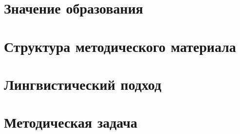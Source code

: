 

\section{Значение образования}



\section{Структура методического материала}



\section{Лингвистический подход}


\section{Методическая задача}





